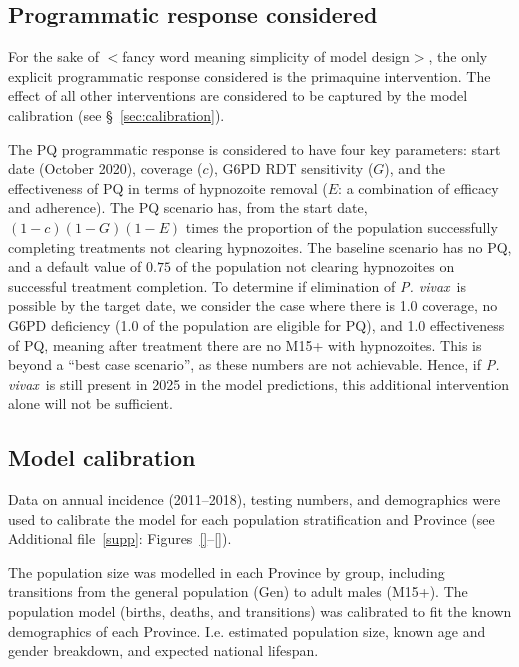 \documentclass[doublespacing]{bmcart}
\newcommand{\pv}{\textit{P. vivax}}
\begin{document}
\subsection*{Programmatic response considered}
For the sake of $<$fancy word meaning simplicity of model design$>$, the only explicit programmatic response considered is the primaquine intervention. The effect of all other interventions are considered to be captured by the model calibration (see \S~\ref{sec:calibration}).

The PQ programmatic response is considered to have four key parameters: start date (October 2020), coverage ($c$), G6PD RDT sensitivity ($G$), and the effectiveness of PQ in terms of hypnozoite removal ($E$: a combination of efficacy and adherence). The PQ scenario has, from the start date, $(1-c)(1-G)(1-E)$ times the proportion of the population successfully completing treatments not clearing hypnozoites. The baseline scenario has no PQ, and a default value of $0.75$ of the population not clearing hypnozoites on successful treatment completion. To determine if elimination of \pv~is possible by the target date, we consider the case where there is 1.0 coverage, no G6PD deficiency (1.0 of the population are eligible for PQ), and 1.0 effectiveness of PQ, meaning after treatment there are no M15+ with hypnozoites. This is beyond a ``best case scenario'', as these numbers are not achievable. Hence, if \pv~is still present in 2025 in the model predictions, this additional intervention alone will not be sufficient.  

\subsection*{Model calibration} \label{sec:calibration} %

Data on annual incidence (2011--2018), testing numbers, and demographics were used to calibrate the model for each population stratification and Province (see Additional file~\ref{supp}: Figures~\ref{}--\ref{}). 

The population size was modelled in each Province by group, including transitions from the general population (Gen) to adult males (M15+). The population model (births, deaths, and transitions) was calibrated to fit the known demographics of each Province. I.e. estimated population size, known age and gender breakdown, and expected national lifespan.
\end{document}

